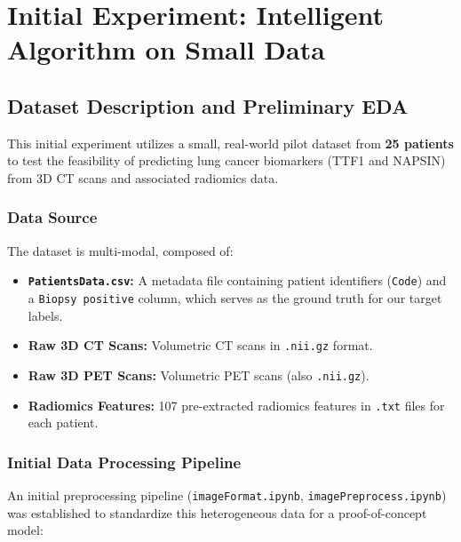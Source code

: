 \section{Initial Experiment: Intelligent Algorithm on Small Data}

\subsection{Dataset Description and Preliminary EDA}

This initial experiment utilizes a small, real-world pilot dataset from \textbf{25 patients} to test the feasibility of predicting lung cancer biomarkers (TTF1 and NAPSIN) from 3D CT scans and associated radiomics data.

\subsubsection{Data Source}
The dataset is multi-modal, composed of:
\begin{itemize}
    \item \textbf{\texttt{PatientsData.csv}:} A metadata file containing patient identifiers (\texttt{Code}) and a \texttt{Biopsy positive} column, which serves as the ground truth for our target labels.
    \item \textbf{Raw 3D CT Scans:} Volumetric CT scans in \texttt{.nii.gz} format.
    \item \textbf{Raw 3D PET Scans:} Volumetric PET scans (also \texttt{.nii.gz}).
    \item \textbf{Radiomics Features:} 107 pre-extracted radiomics features in \texttt{.txt} files for each patient.
\end{itemize}

\subsubsection{Initial Data Processing Pipeline}
An initial preprocessing pipeline (\texttt{imageFormat.ipynb}, \texttt{imagePreprocess.ipynb}) was established to standardize this heterogeneous data for a proof-of-concept model:

